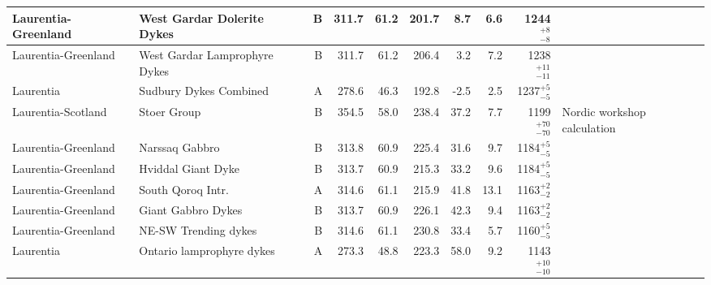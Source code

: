 \begin{longtable}{p{1 in}p{1 in}rrrrrrrp{1.5 in}}
           Laurentia-Greenland &                       West Gardar Dolerite Dykes &      B &     311.7 &      61.2 & 201.7 &   8.7 &       6.6 &     1244$^{+8}_{-8}$ &                                  \cite{Piper1977b} \\ \hline
           Laurentia-Greenland &                    West Gardar Lamprophyre Dykes &      B &     311.7 &      61.2 & 206.4 &   3.2 &       7.2 &   1238$^{+11}_{-11}$ &                                  \cite{Piper1977b} \\ \hline
                     Laurentia &                           Sudbury Dykes Combined &      A &     278.6 &      46.3 & 192.8 &  -2.5 &       2.5 &     1237$^{+5}_{-5}$ &                                 \cite{Palmer1977a} \\ \hline
            Laurentia-Scotland &                                      Stoer Group &      B &     354.5 &      58.0 & 238.4 &  37.2 &       7.7 &   1199$^{+70}_{-70}$ &                        Nordic workshop calculation \\ \hline
           Laurentia-Greenland &                                   Narssaq Gabbro &      B &     313.8 &      60.9 & 225.4 &  31.6 &       9.7 &     1184$^{+5}_{-5}$ &                                  \cite{Piper1977a} \\ \hline
           Laurentia-Greenland &                               Hviddal Giant Dyke &      B &     313.7 &      60.9 & 215.3 &  33.2 &       9.6 &     1184$^{+5}_{-5}$ &                                  \cite{Piper1977a} \\ \hline
           Laurentia-Greenland &                                South Qoroq Intr. &      A &     314.6 &      61.1 & 215.9 &  41.8 &      13.1 &     1163$^{+2}_{-2}$ &                                  \cite{Piper1992a} \\ \hline
           Laurentia-Greenland &                               Giant Gabbro Dykes &      B &     313.7 &      60.9 & 226.1 &  42.3 &       9.4 &     1163$^{+2}_{-2}$ &                                  \cite{Piper1977a} \\ \hline
           Laurentia-Greenland &                             NE-SW Trending dykes &      B &     314.6 &      61.1 & 230.8 &  33.4 &       5.7 &     1160$^{+5}_{-5}$ &                                  \cite{Piper1992a} \\ \hline
                     Laurentia &                        Ontario lamprophyre dykes &      A &     273.3 &      48.8 & 223.3 &  58.0 &       9.2 &   1143$^{+10}_{-10}$ &                                 \cite{Piispa2018a} \\ \hline

\end{longtable}
